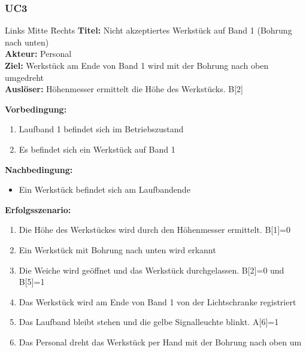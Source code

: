 \documentclass[oneside,a4paper,titlepage]{scrartcl} %
\begin{document}
\subsubsection{UC3}
\begin{tabbing}
 Links \= Mitte \= Rechts \kill
 \textbf{Titel:} \> \> Nicht akzeptiertes Werkstück auf Band 1 (Bohrung nach unten)\\
 \textbf{Akteur:} \> \> Personal\\
 \textbf{Ziel:} \> \> Werkstück am Ende von Band 1 wird mit der Bohrung nach oben umgedreht\\
 \textbf{Auslöser:} \> \> Höhenmesser ermittelt die Höhe des Werkstücks. B[2]\\
\end{tabbing}
\textbf{Vorbedingung:}
\begin{enumerate}
 \item Laufband 1 befindet sich im Betriebszustand
 \item Es befindet sich ein Werkstück auf Band 1
\end{enumerate}
\textbf{Nachbedingung:}
\begin{itemize}
 \item Ein Werkstück befindet sich am Laufbandende
\end{itemize}
\textbf{Erfolgsszenario:}
\begin{enumerate}
 \item Die Höhe des Werkstückes wird durch den Höhenmesser ermittelt. B[1]=0
 \item Ein Werkstück mit Bohrung nach unten wird erkannt
 \item Die Weiche wird geöffnet und das Werkstück durchgelassen. B[2]=0 und B[5]=1
 \item Das Werkstück wird am Ende von Band 1 von der Lichtschranke registriert
 \item Das Laufband bleibt stehen und die gelbe Signalleuchte blinkt. A[6]=1
 \item Das Personal dreht das Werkstück per Hand mit der Bohrung nach oben um
\end{enumerate}

\newpage
\end{document}
